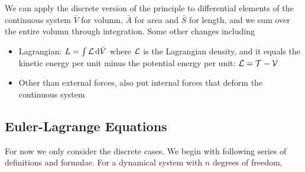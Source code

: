 \documentclass{article}
\begin{document}
We can apply the discrete version of the principle to differential elements of the continuous system \(\bar V\) for volumn, \(\bar A\) for area and \(\bar S\) for length, and we sum over the entire volumn through integration. Some other changes including

\begin{itemize}
    \item Lagrangian: \(L = \int \mathcal{L}\,\mathrm{d} \bar V\) where \(\mathcal{L}\) is the Lagrangian density, and it equals the kinetic energy per unit minus the potential energy per unit: \(\mathcal{L}=\mathcal{T}-\mathcal{V}\)
    \item Other than external forces, also put internal forces that deform the continuous system
\end{itemize}
  

\subsection{Euler-Lagrange Equations}

For now we only consider the discrete cases. We begin with following series of definitions and formulae. For a dynamical system with \(n\) degrees of freedom,
\end{document}
